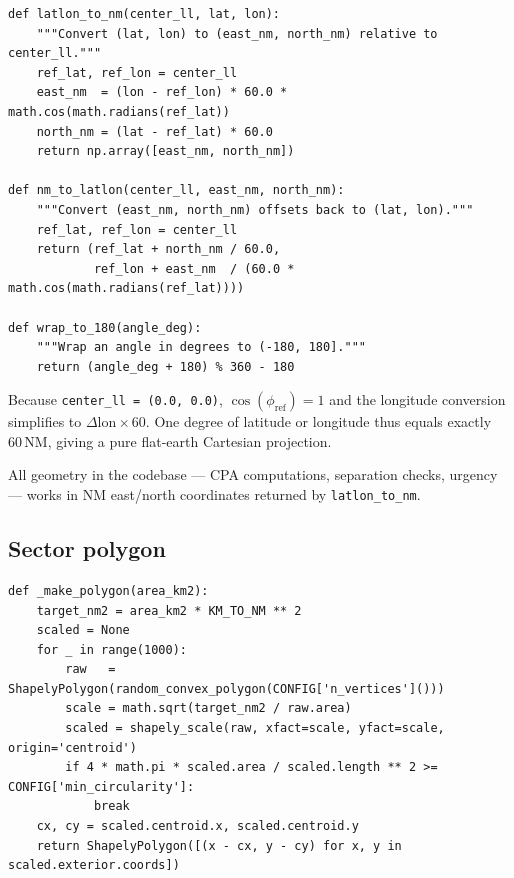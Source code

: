 \documentclass[11pt, a4paper]{article}
\begin{document}
\begin{lstlisting}[caption={Flat-earth projection between geographic and NM coordinates.}]
def latlon_to_nm(center_ll, lat, lon):
    """Convert (lat, lon) to (east_nm, north_nm) relative to center_ll."""
    ref_lat, ref_lon = center_ll
    east_nm  = (lon - ref_lon) * 60.0 * math.cos(math.radians(ref_lat))
    north_nm = (lat - ref_lat) * 60.0
    return np.array([east_nm, north_nm])

def nm_to_latlon(center_ll, east_nm, north_nm):
    """Convert (east_nm, north_nm) offsets back to (lat, lon)."""
    ref_lat, ref_lon = center_ll
    return (ref_lat + north_nm / 60.0,
            ref_lon + east_nm  / (60.0 * math.cos(math.radians(ref_lat))))

def wrap_to_180(angle_deg):
    """Wrap an angle in degrees to (-180, 180]."""
    return (angle_deg + 180) % 360 - 180
\end{lstlisting}

Because \texttt{center\_ll = (0.0, 0.0)}, $\cos(\phi_\text{ref}) = 1$ and the
longitude conversion simplifies to $\Delta\text{lon} \times 60$.
One degree of latitude or longitude thus equals exactly 60\,NM, giving a
pure flat-earth Cartesian projection.

All geometry in the codebase --- CPA computations, separation checks, urgency ---
works in NM east/north coordinates returned by \texttt{latlon\_to\_nm}.

\subsection{Sector polygon}

\begin{lstlisting}[caption={Generating a random convex sector polygon of the required area.}]
def _make_polygon(area_km2):
    target_nm2 = area_km2 * KM_TO_NM ** 2
    scaled = None
    for _ in range(1000):
        raw   = ShapelyPolygon(random_convex_polygon(CONFIG['n_vertices']()))
        scale = math.sqrt(target_nm2 / raw.area)
        scaled = shapely_scale(raw, xfact=scale, yfact=scale, origin='centroid')
        if 4 * math.pi * scaled.area / scaled.length ** 2 >= CONFIG['min_circularity']:
            break
    cx, cy = scaled.centroid.x, scaled.centroid.y
    return ShapelyPolygon([(x - cx, y - cy) for x, y in scaled.exterior.coords])
\end{lstlisting}
\end{document}
